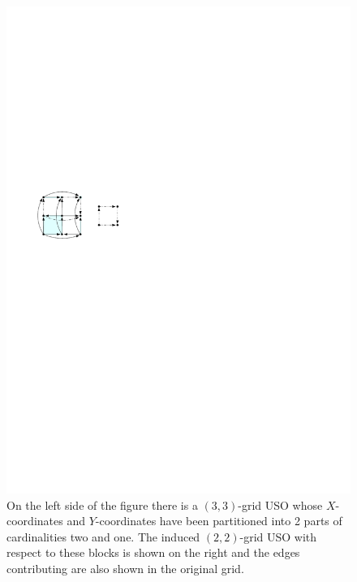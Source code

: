 \documentclass[runningheads,a4paper]{llncs}
\begin{document}
  \begin{figure}[htbp] 
  	\centering
  	\includegraphics[scale=1]{induced_orientation_ex.pdf}
  	\caption{\small On the left side of the figure there is a $(3,3)$-grid USO whose $X$-coordinates and $Y$-coordinates have been partitioned into 2 parts of cardinalities two and one. The induced $(2,2)$-grid USO with respect to these blocks is shown on the right and the edges contributing are also shown in the original grid.} 
  	\label{fig:example_induced_orientation}
  \end{figure}
\end{document}
